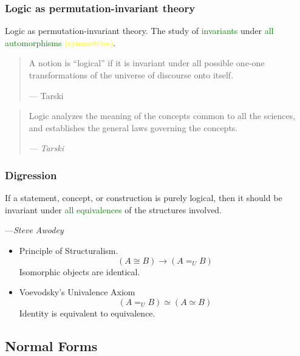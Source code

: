 \documentclass[UTF8,aspectratio=43,11pt,colorlinks,compress,openany]{beamer}%
\begin{document}
\begin{frame}\frametitle{Logic as permutation-invariant theory}
	\begin{block}{Logic as permutation-invariant theory.}
		The study of \textcolor{green}{invariants} under \textcolor{green}{all automorphisms} \textcolor{yellow}{(symmetries)}.
	\end{block}
	\begin{quote}
		A notion is ``logical'' if it is invariant under all possible one-one transformations of the universe of discourse onto itself.\par
		\hfill --- {Tarski}
	\end{quote}
	\begin{quote}
		Logic analyzes the meaning of the concepts common to all the sciences, and establishes the general laws governing the concepts.\par\hfill --- \textsl{Tarski}
	\end{quote}
\end{frame}

\begin{frame}\frametitle{Digression}
If a statement, concept, or construction is purely logical, then it should be invariant under \textcolor{green}{all equivalences} of the structures involved.\par\hfill---\textsl{Steve Awodey}
\begin{itemize}
	\item Principle of Structuralism.
	\[(A\cong B)\to(A=_UB)\]
	Isomorphic objects are identical.
	\item Voevodsky's Univalence Axiom
	\[(A=_UB)\simeq (A\simeq B)\]
	Identity is equivalent to equivalence.
\end{itemize}
\end{frame}

\subsection{Normal Forms}
\end{document}
